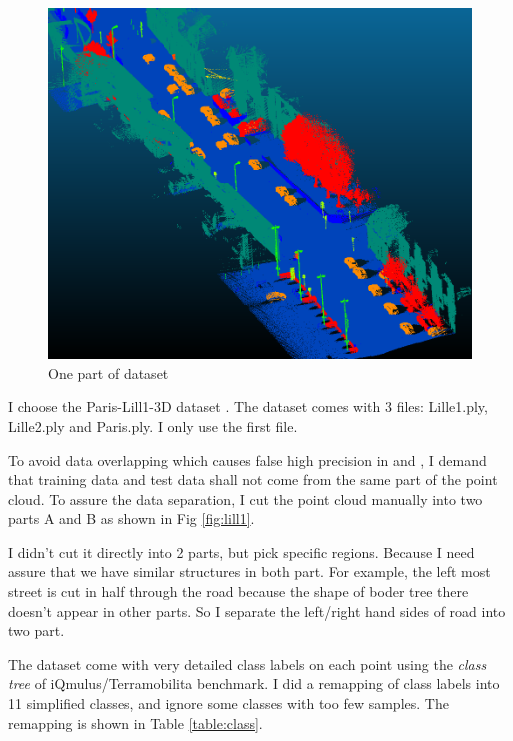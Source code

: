 \documentclass{article}
\begin{document}
\begin{figure}[h]
	\centering
	\includegraphics[width=12cm]{part.png}
	\caption{One part of dataset}
	\label{fig:part}
\end{figure}

I choose the Paris-Lill1-3D dataset \cite{2017arXiv171200032R}. The dataset comes with 3 files: Lille1.ply, Lille2.ply and Paris.ply. I only use the first file.

To avoid data overlapping which causes false high precision in \cite{hackel2016fast} and \cite{weinmann2015}, I demand that training data and test data shall not come from the same part of the point cloud. To assure the data separation, I cut the point cloud manually into two parts A and B as shown in Fig \ref{fig:lill1}.


I didn't cut it directly into 2 parts, but pick specific regions. Because I need assure that we have similar structures in both part. For example, the left most street is cut in half through the road because the shape of boder tree there doesn't appear in other parts. So I separate the left/right hand sides of road into two part.

The dataset come with very detailed class labels on each point using the \textit{class tree} of iQmulus/Terramobilita benchmark. I did a remapping of class labels into 11 simplified classes, and ignore some classes with too few samples. The remapping is shown in Table \ref{table:class}.
\end{document}

